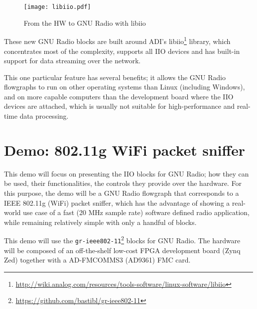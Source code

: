 \documentclass{acm_proc_article-sp}
\begin{document}
\begin{figure}[htbp]
\centering
\texttt{[image: libiio.pdf]}
\caption{From the HW to GNU Radio with libiio}
\end{figure}

These new GNU Radio blocks are built around ADI's
libiio\footnote{\url{http://wiki.analog.com/resources/tools-software/linux-software/libiio}}
library, which concentrates most of the complexity,
supports all IIO devices and has built-in support
for data streaming over the network.

This one particular feature
has several benefits; it allows the GNU Radio flowgraphs to run
on other operating systems than Linux (including Windows),
and on more capable computers than the development board
where the IIO devices are attached, which is usually not
suitable for high-performance and real-time data processing.

\section{Demo: 802.11g WiFi packet sniffer}

This demo will focus on presenting the IIO blocks for GNU Radio; how they can be
used, their functionalities, the controls they provide over the hardware.
For this purpose, the demo will be a GNU Radio flowgraph that corresponds to a
IEEE 802.11g (WiFi) packet sniffer, which has the advantage of showing a
real-world use case of a fast (20 MHz sample rate) software defined radio
application, while remaining relatively simple with only a handful of blocks.

This demo will use the
\texttt{gr-ieee802-11}\footnote{\url{https://github.com/bastibl/gr-ieee802-11}}
blocks for GNU Radio. The hardware will be composed of an off-the-shelf low-cost
FPGA development board (Zynq Zed) together with a AD-FMCOMMS3 (AD9361) FMC card.

\balancecolumns
\end{document}
